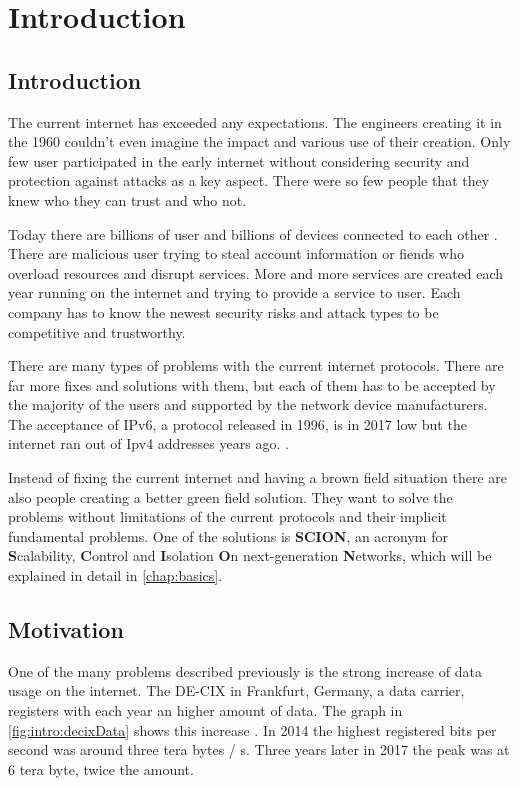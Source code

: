 \documentclass[thesis.tex]{subfiles}
\begin{document}
\chapter{Introduction}
\label{chap:introduction}


\section{Introduction}
The current internet  has exceeded any expectations. The engineers creating it in the 1960 couldn't even imagine the impact and various use of their creation. Only few user participated in the early internet without considering security and protection against attacks as a key aspect. There were so few people that they knew who they can trust and who not.

Today there are billions of user and billions of devices connected to each other . There are malicious user trying to steal account information or fiends who overload resources and disrupt services. More and more services are created each year running on the internet and trying to provide a service to user. Each company has to know the newest security risks and attack types to be competitive and trustworthy. 

There are many types of problems with the current internet protocols. There are far more fixes and solutions with them, but each of them has to be accepted by the majority of the users and supported by the network device manufacturers. The acceptance of IPv6, a protocol released in 1996, is in 2017 low but the internet ran out of Ipv4 addresses years ago. .

Instead of fixing the current internet and having a brown field situation there are also people creating a better green field solution. They want to solve the problems without limitations of the current protocols and their implicit fundamental problems. One of the solutions is \textbf{SCION}, an acronym for \textbf{S}calability, \textbf{C}ontrol and \textbf{I}solation \textbf{O}n next-generation \textbf{N}etworks, which will be explained in detail in \autoref{chap:basics}.


\section{Motivation}
One of the many problems described previously is the strong increase of data usage on the internet. The DE-CIX in Frankfurt, Germany, a data carrier, registers with each year an higher amount of data. The graph in \autoref{fig:intro:decixData} shows this increase . In 2014 the highest registered bits per second was around three tera bytes / s. Three years later in 2017 the peak was at 6 tera byte, twice the amount. 
\end{document}
